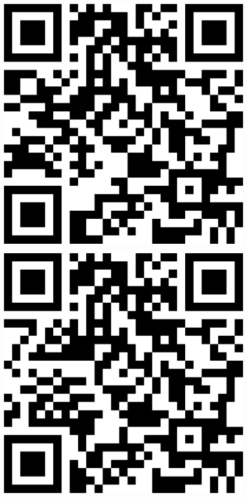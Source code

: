 \documentclass[letterpaper]{article}
\begin{document}
 \endgroup 
 \vspace*{\fill} 
 \pagebreak 
{} 
 \vspace*{\fill} 
 \begingroup 
 \centerline{\includegraphics[scale=1,width=5in,height=5in]{Office3619.png}} 
 \endgroup 
 \vspace*{\fill} 
 \pagebreak 
{} 
 \vspace*{\fill} 
 \begingroup 
 \centerline{\includegraphics[scale=1,width=5in,height=5in]{Office3621.png}} 
\end{document}
